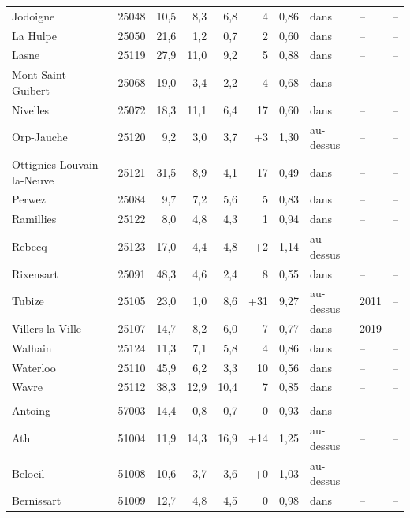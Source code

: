 \begin{longtable}{lrrrrrrlll}
Jodoigne & 25048 & 10{,}5 & 8{,}3 & 6{,}8 & \textminus{}4 & 0{,}86 & dans & -- & -- \\
La Hulpe & 25050 & 21{,}6 & 1{,}2 & 0{,}7 & \textminus{}2 & 0{,}60 & dans & -- & -- \\
Lasne & 25119 & 27{,}9 & 11{,}0 & 9{,}2 & \textminus{}5 & 0{,}88 & dans & -- & -- \\
Mont-Saint-Guibert & 25068 & 19{,}0 & 3{,}4 & 2{,}2 & \textminus{}4 & 0{,}68 & dans & -- & -- \\
Nivelles & 25072 & 18{,}3 & 11{,}1 & 6{,}4 & \textminus{}17 & 0{,}60 & dans & -- & -- \\
Orp-Jauche & 25120 & 9{,}2 & 3{,}0 & 3{,}7 & +3 & 1{,}30 & au-dessus & -- & -- \\
Ottignies-Louvain-la-Neuve & 25121 & 31{,}5 & 8{,}9 & 4{,}1 & \textminus{}17 & 0{,}49 & dans & -- & -- \\
Perwez & 25084 & 9{,}7 & 7{,}2 & 5{,}6 & \textminus{}5 & 0{,}83 & dans & -- & -- \\
Ramillies & 25122 & 8{,}0 & 4{,}8 & 4{,}3 & \textminus{}1 & 0{,}94 & dans & -- & -- \\
Rebecq & 25123 & 17{,}0 & 4{,}4 & 4{,}8 & +2 & 1{,}14 & au-dessus & -- & -- \\
Rixensart & 25091 & 48{,}3 & 4{,}6 & 2{,}4 & \textminus{}8 & 0{,}55 & dans & -- & -- \\
Tubize & 25105 & 23{,}0 & 1{,}0 & 8{,}6 & +31 & 9{,}27 & au-dessus & 2011 & -- \\
Villers-la-Ville & 25107 & 14{,}7 & 8{,}2 & 6{,}0 & \textminus{}7 & 0{,}77 & dans & 2019 & -- \\
Walhain & 25124 & 11{,}3 & 7{,}1 & 5{,}8 & \textminus{}4 & 0{,}86 & dans & -- & -- \\
Waterloo & 25110 & 45{,}9 & 6{,}2 & 3{,}3 & \textminus{}10 & 0{,}56 & dans & -- & -- \\
Wavre & 25112 & 38{,}3 & 12{,}9 & 10{,}4 & \textminus{}7 & 0{,}85 & dans & -- & -- \\
\addlinespace
\multicolumn{10}{l}{\textbf{Hainaut 1} (36 communes)} \\
Antoing & 57003 & 14{,}4 & 0{,}8 & 0{,}7 & \textminus{}0 & 0{,}93 & dans & -- & -- \\
Ath & 51004 & 11{,}9 & 14{,}3 & 16{,}9 & +14 & 1{,}25 & au-dessus & -- & -- \\
Beloeil & 51008 & 10{,}6 & 3{,}7 & 3{,}6 & +0 & 1{,}03 & au-dessus & -- & -- \\
Bernissart & 51009 & 12{,}7 & 4{,}8 & 4{,}5 & \textminus{}0 & 0{,}98 & dans & -- & -- \\

\end{longtable}
